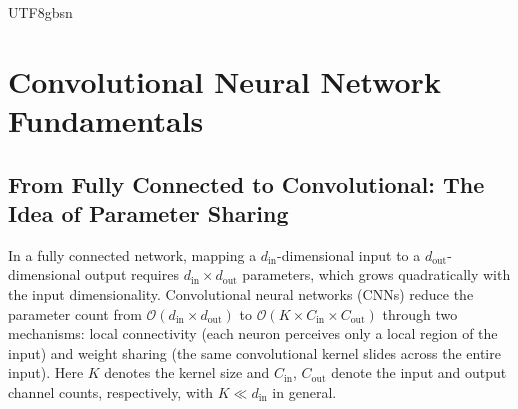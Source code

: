 \documentclass[a4paper,12pt]{report}
\begin{document}
\begin{CJK}{UTF8}{gbsn}
\begin{table}[H]
  \centering
  \caption{Systematic comparison of classical RBFNN and modular RBFNN}
  \label{tab:rbf_comparison}
\end{table}

\chapter{Convolutional Neural Network Fundamentals}
\label{chap:cnn}

\section{From Fully Connected to Convolutional: The Idea of Parameter Sharing}
\label{sec:fc_to_conv}

In a fully connected network, mapping a $d_{\text{in}}$-dimensional input to a
$d_{\text{out}}$-dimensional output requires $d_{\text{in}} \times d_{\text{out}}$
parameters, which grows quadratically with the input dimensionality. Convolutional
neural networks (CNNs) reduce the parameter count from
$\mathcal{O}(d_{\text{in}} \times d_{\text{out}})$ to
$\mathcal{O}(K \times C_{\text{in}} \times C_{\text{out}})$ through two mechanisms:
local connectivity (each neuron perceives only a local region of the input) and weight
sharing (the same convolutional kernel slides across the entire input). Here $K$ denotes
the kernel size and $C_{\text{in}}$, $C_{\text{out}}$ denote the input and output channel
counts, respectively, with $K \ll d_{\text{in}}$ in general.


\end{CJK}
\end{document}
